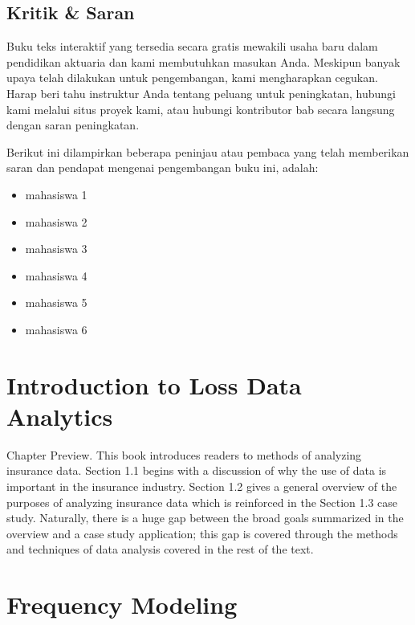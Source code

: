 \documentclass[
]{book}
\providecommand{\tightlist}{%
  \setlength{\itemsep}{0pt}\setlength{\parskip}{0pt}}
\begin{document}
\hypertarget{kritik-saran}{%
\section*{Kritik \& Saran}\label{kritik-saran}}

Buku teks interaktif yang tersedia secara gratis mewakili usaha baru dalam pendidikan aktuaria dan kami membutuhkan masukan Anda. Meskipun banyak upaya telah dilakukan untuk pengembangan, kami mengharapkan cegukan. Harap beri tahu instruktur Anda tentang peluang untuk peningkatan, hubungi kami melalui situs proyek kami, atau hubungi kontributor bab secara langsung dengan saran peningkatan.

Berikut ini dilampirkan beberapa peninjau atau pembaca yang telah memberikan saran dan pendapat mengenai pengembangan buku ini, adalah:

\begin{itemize}
\tightlist
\item
  mahasiswa 1
\item
  mahasiswa 2
\item
  mahasiswa 3
\item
  mahasiswa 4
\item
  mahasiswa 5
\item
  mahasiswa 6
\end{itemize}

\hypertarget{introduction-to-loss-data-analytics}{%
\chapter{Introduction to Loss Data Analytics}\label{introduction-to-loss-data-analytics}}

Chapter Preview. This book introduces readers to methods of analyzing insurance data. Section 1.1 begins with a discussion of why the use of data is important in the insurance industry. Section 1.2 gives a general overview of the purposes of analyzing insurance data which is reinforced in the Section 1.3 case study. Naturally, there is a huge gap between the broad goals summarized in the overview and a case study application; this gap is covered through the methods and techniques of data analysis covered in the rest of the text.

\hypertarget{frequency-modeling}{%
\chapter{Frequency Modeling}\label{frequency-modeling}}
\end{document}
